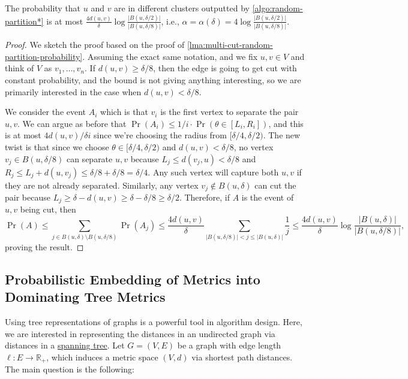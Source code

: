 \begin{theorem}\label{thm:random-partition*}
  The probability that \(u\) and \(v\) are in different clusters outputted by \autoref{algo:random-partition*} is at most \(\frac{4 d(u, v)}{\delta } \log \frac{\lvert B(u, \delta / 2) \rvert }{\lvert B(u, \delta / 8) \rvert }\), i.e., \(\alpha = \alpha (\delta ) = 4 \log \frac{\lvert B(u, \delta / 2) \rvert }{\lvert B(u, \delta / 8) \rvert }\).
\end{theorem}
\begin{proof}
  We sketch the proof based on the proof of \autoref{lma:multi-cut-random-partition-probability}. Assuming the exact same notation, and we fix \(u, v \in V\) and think of \(V\) as \(v_1, \dots , v_n\). If \(d(u, v) \geq \delta / 8\), then the edge is going to get cut with constant probability, and the bound is not giving anything interesting, so we are primarily interested in the case when \(d(u, v) < \delta / 8\).

  We consider the event \(A_i\) which is that \(v_i\) is the first vertex to separate the pair \(u, v\). We can argue as before that \(\Pr(A_i) \leq 1 / i \cdot \Pr(\theta \in [L_i, R_i])\), and this is at most \(4d(u, v) / \delta i\) since we're choosing the radius from \([\delta / 4, \delta / 2)\). The new twist is that since we choose \(\theta \in [\delta / 4, \delta / 2)\) and \(d(u, v) <\delta / 8\), no vertex \(v_j \in B(u, \delta / 8)\) can separate \(u, v\) because \(L_j \leq d(v_j, u) < \delta / 8\) and \(R_j \leq L_j + d(u, v_j) \leq \delta / 8 + \delta / 8 = \delta / 4\). Any such vertex will capture both \(u, v\) if they are not already separated. Similarly, any vertex \(v_j \notin B(u, \delta )\) can cut the pair because \(L_j \geq \delta - d(u, v) \geq \delta - \delta / 8 \geq \delta / 2\). Therefore, if \(A\) is the event of \(u, v\) being cut, then
  \[
    \Pr(A)
    \leq \sum_{j \in B(u, \delta ) \setminus B(u, \delta / 8)} \Pr(A_j)
    \leq \frac{4d(u, v)}{\delta } \sum_{\lvert B(u, \delta / 8) \rvert < j \leq \lvert B(u, \delta ) \rvert } \frac{1}{j}
    \leq \frac{4 d(u, v)}{\delta } \log \frac{\lvert B(u, \delta ) \rvert }{\lvert B(u, \delta / 8) \rvert },
  \]
  proving the result.
\end{proof}

\subsection{Probabilistic Embedding of Metrics into Dominating Tree Metrics}
Using tree representations of graphs is a powerful tool in algorithm design. Here, we are interested in representing the distances in an undirected graph via distances in a \hyperref[def:spanning-tree]{spanning tree}. Let \(G = (V, E)\) be a graph with edge length \(\ell \colon E \to \mathbb{R} _+\), which induces a metric space \((V, d)\) via shortest path distances. The main question is the following:

